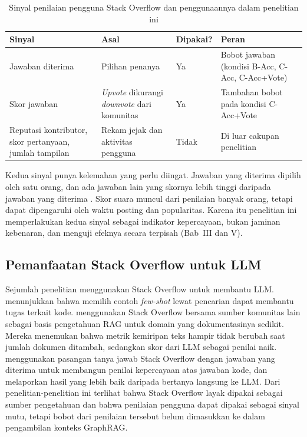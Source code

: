 \begin{table}[!htbp]
\centering
\caption{Sinyal penilaian pengguna Stack Overflow dan penggunaannya dalam penelitian ini}
\label{tab:so_signals}
\small
\begin{tabular}{|p{3.2cm}|p{4.4cm}|p{2.3cm}|p{3.2cm}|}
\hline
\textbf{Sinyal} & \textbf{Asal} & \textbf{Dipakai?} & \textbf{Peran} \\
\hline
Jawaban diterima &
Pilihan penanya &
Ya &
Bobot jawaban (kondisi B-Acc, C-Acc, C-Acc+Vote) \\
\hline
Skor jawaban &
\emph{Upvote} dikurangi \emph{downvote} dari komunitas &
Ya &
Tambahan bobot pada kondisi C-Acc+Vote \\
\hline
Reputasi kontributor, skor pertanyaan, jumlah tampilan &
Rekam jejak dan aktivitas pengguna &
Tidak &
Di luar cakupan penelitian \\
\hline
\end{tabular}
\end{table}

Kedua sinyal punya kelemahan yang perlu diingat. Jawaban yang diterima dipilih oleh satu orang, dan ada jawaban lain yang skornya lebih tinggi daripada jawaban yang diterima \autocite{Kleybolte2026}. Skor suara muncul dari penilaian banyak orang, tetapi dapat dipengaruhi oleh waktu posting dan popularitas. Karena itu penelitian ini memperlakukan kedua sinyal sebagai indikator kepercayaan, bukan jaminan kebenaran, dan menguji efeknya secara terpisah (Bab~III dan V).

\subsection{Pemanfaatan Stack Overflow untuk LLM}

Sejumlah penelitian menggunakan Stack Overflow untuk membantu LLM. \textcite{Nashid2023} menunjukkan bahwa memilih contoh \emph{few-shot} lewat pencarian dapat membantu tugas terkait kode. \textcite{Mereu2026} menggunakan Stack Overflow bersama sumber komunitas lain sebagai basis pengetahuan RAG untuk domain yang dokumentasinya sedikit. Mereka menemukan bahwa metrik kemiripan teks hampir tidak berubah saat jumlah dokumen ditambah, sedangkan skor dari LLM sebagai penilai naik. \textcite{Weng2026} menggunakan pasangan tanya jawab Stack Overflow dengan jawaban yang diterima untuk membangun penilai kepercayaan atas jawaban kode, dan melaporkan hasil yang lebih baik daripada bertanya langsung ke LLM. Dari penelitian-penelitian ini terlihat bahwa Stack Overflow layak dipakai sebagai sumber pengetahuan dan bahwa penilaian pengguna dapat dipakai sebagai sinyal mutu, tetapi bobot dari penilaian tersebut belum dimasukkan ke dalam pengambilan konteks GraphRAG.


